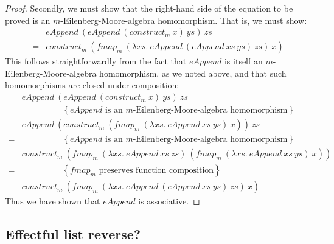 \documentclass{jfp1}
\newcommand{\eqAnnotation}[1]{\hspace{2cm}\left\{\textrm{#1}\right\}}
\begin{document}
\begin{proof}
  Secondly, we must show that the right-hand side of the equation to
  be proved is an $m$-Eilenberg-Moore-algebra homomorphism. That is,
  we must show:
  \begin{displaymath}
    \begin{array}{cl}
      &\mathit{eAppend}~(\mathit{eAppend}~(\mathit{construct}_m~x)~\mathit{ys})~\mathit{zs} \\
      =&\mathit{construct}_m~(\mathit{fmap}_m~(\lambda \mathit{xs}.~\mathit{eAppend}~(\mathit{eAppend}~\mathit{xs}~\mathit{ys})~\mathit{zs})~x)
    \end{array}
  \end{displaymath}
  This follows straightforwardly from the fact that $\mathit{eAppend}$
  is itself an $m$-Eilenberg-Moore-algebra homomorphism, as we noted
  above, and that such homomorphisms are closed under composition:
  \begin{displaymath}
    \begin{array}{cl}
      & \mathit{eAppend}~(\mathit{eAppend}~(\mathit{construct}_m~x)~\mathit{ys})~\mathit{zs} \\
      =&\eqAnnotation{$\mathit{eAppend}$ is an $m$-Eilenberg-Moore-algebra homomorphism} \\
      & \mathit{eAppend}~(\mathit{construct}_m~(\mathit{fmap}_m~(\lambda \mathit{xs}.~\mathit{eAppend}~\mathit{xs}~\mathit{ys})~x))~\mathit{zs} \\
      =&\eqAnnotation{$\mathit{eAppend}$ is an $m$-Eilenberg-Moore-algebra homomorphism} \\
      & \mathit{construct_m}~(\mathit{fmap}_m~(\lambda \mathit{xs}.~\mathit{eAppend}~\mathit{xs}~\mathit{zs})~(\mathit{fmap}_m~(\lambda \mathit{xs}.~\mathit{eAppend}~\mathit{xs}~\mathit{ys})~x)) \\
      =&\eqAnnotation{$\mathit{fmap}_m$ preserves function composition} \\
      & \mathit{construct_m}~(\mathit{fmap}_m~(\lambda \mathit{xs}.~\mathit{eAppend}~(\mathit{eAppend}~\mathit{xs}~\mathit{ys})~\mathit{zs})~x)
    \end{array}
  \end{displaymath}
  Thus we have shown that $\mathit{eAppend}$ is associative.
\end{proof}

\subsection{Effectful list reverse?}
\end{document}
